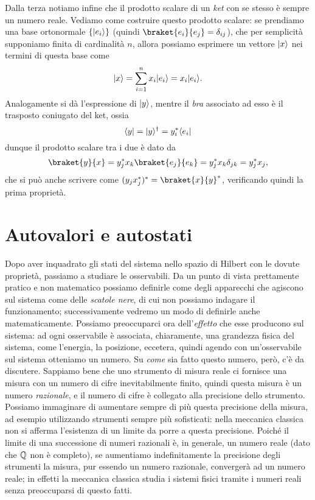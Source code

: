 Dalla terza notiamo infine che il prodotto scalare di un \emph{ket} con se stesso è sempre un numero reale.
Vediamo come costruire questo prodotto scalare: se prendiamo una base ortonormale $\{\lvert e_i\rangle\}$ (quindi $\braket{e_i}{e_j}=\delta_{ij}$), che per semplicità supponiamo finita di cardinalità $n$, allora possiamo esprimere un vettore $\lvert x\rangle$ nei termini di questa base come
\begin{equation}
	\lvert x\rangle=\sum_{i=1}^nx_i\lvert e_i\rangle=x_i\lvert e_i\rangle.
\end{equation}
Analogamente si dà l'espressione di $\lvert y\rangle$, mentre il \emph{bra} associato ad esso è il trasposto coniugato del ket, ossia
\begin{equation}
	\langle y\rvert=\lvert y\rangle^\dagger=y_i^*\langle e_i\rvert
\end{equation}
dunque il prodotto scalare tra i due è dato da
\begin{equation}
	\braket{y}{x}=y_j^*x_k\braket{e_j}{e_k}=y_j^*x_k\delta_{jk}=y_j^*x_j,
\end{equation}
che si può anche scrivere come $(y_jx_j^*)^*=\braket{x}{y}^*$, verificando quindi la prima proprietà.

\section{Autovalori e autostati}
Dopo aver inquadrato gli stati del sistema nello spazio di Hilbert con le dovute proprietà, passiamo a studiare le osservabili.
Da un punto di vista prettamente pratico e non matematico possiamo definirle come degli apparecchi che agiscono sul sistema come delle \emph{scatole nere}, di cui non possiamo indagare il funzionamento; successivamente vedremo un modo di definirle anche matematicamente.
Possiamo preoccuparci ora dell'\emph{effetto} che esse producono sul sistema: ad ogni osservabile è associata, chiaramente, una grandezza fisica del sistema, come l'energia, la posizione, eccetera, quindi agendo con un'osservabile sul sistema otteniamo un numero.
Su \emph{come} sia fatto questo numero, però, c'è da discutere.
Sappiamo bene che uno strumento di misura reale ci fornisce una misura con un numero di cifre inevitabilmente finito, quindi questa misura è un numero \emph{razionale}, e il numero di cifre è collegato alla precisione dello strumento.
Possiamo immaginare di aumentare sempre di più questa precisione della misura, ad esempio utilizzando strumenti sempre più sofisticati: nella meccanica classica non si afferma l'esistenza di un limite da porre a questa precisione.
Poich\'e il limite di una successione di numeri razionali è, in generale, un numero reale (dato che $\mathbb{Q}$ non è completo), se aumentiamo indefinitamente la precisione degli strumenti la misura, pur essendo un numero razionale, convergerà ad un numero reale; in effetti la meccanica classica studia i sistemi fisici tramite i numeri reali senza preoccuparsi di questo fatti.

